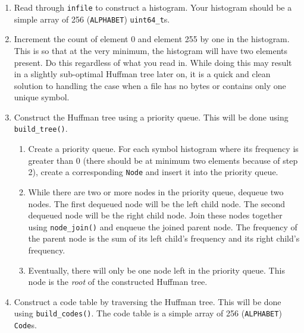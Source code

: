 \documentclass[11pt]{article}
\begin{document}
\begin{enumerate}
  \item Read through \texttt{infile} to construct a histogram. Your
    histogram should be a simple array of 256 (\texttt{ALPHABET})
    \texttt{uint64\_t}s.

  \item Increment the count of element 0 and element 255 by one in the
    histogram. This is so that at the very minimum, the histogram will
    have two elements present. Do this regardless of what you read in.
    While doing this may result in a slightly sub-optimal Huffman tree
    later on, it is a quick and clean solution to handling the case when
    a file has no bytes or contains only one unique symbol.

  \item Construct the Huffman tree using a priority queue. This will
    be done using \texttt{build\_tree()}.

    \begin{enumerate}
      \item Create a priority queue. For each symbol histogram where its
        frequency is greater than $0$ (there should be at minimum two
        elements because of step 2), create a corresponding
        \texttt{Node} and insert it into the priority queue.

      \item While there are two or more nodes in the priority queue,
        dequeue two nodes. The first dequeued node will be the left
        child node. The second dequeued node will be the right child
        node. Join these nodes together using \texttt{node\_join()} and
        enqueue the joined parent node. The frequency of the parent node
        is the sum of its left child's frequency and its right child's
        frequency.

      \item Eventually, there will only be one node left in the priority
        queue. This node is the \emph{root} of the constructed Huffman
        tree.
    \end{enumerate}

  \item Construct a code table by traversing the Huffman tree. This will
    be done using \texttt{build\_codes()}. The code table is a simple
    array of 256 (\texttt{ALPHABET}) \texttt{Code}s.


\end{enumerate}
\end{document}
